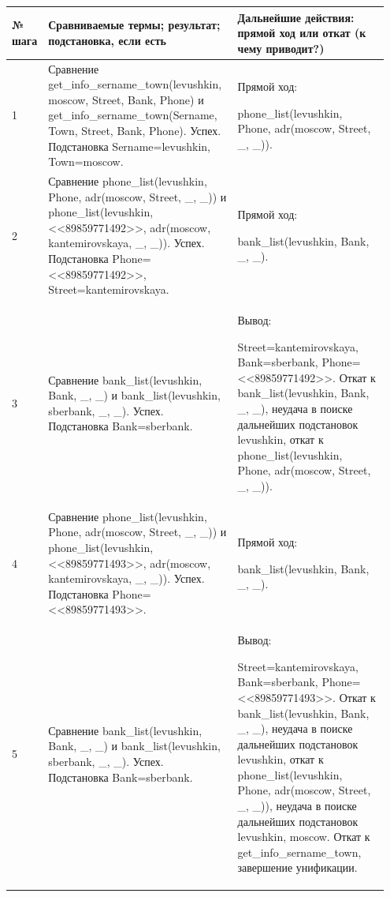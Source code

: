 \documentclass[a4paper,12pt]{article}
\begin{document}
	\begin{table} [h!]
		\begin{center}
			\begin{tabular}{|p{0.05\linewidth}|p{0.5\linewidth}|p{0.4\linewidth}|}
				{\bf  № шага} & {\bf Сравниваемые термы; результат; подстановка, если есть} & {\bf Дальнейшие действия: прямой ход или откат (к чему приводит?)} \\
				\hline
				{1} & {Сравнение get\_info\_sername\_town(levushkin, moscow, Street, Bank, Phone) и get\_info\_sername\_town(Sername, Town, Street, Bank, Phone). Успех. Подстановка Sername=levushkin, Town=moscow.} & {Прямой ход:
					
					 phone\_list(levushkin, Phone, adr(moscow, Street, \_, \_)).}\\
				\hline
				{2} & {Сравнение phone\_list(levushkin, Phone, adr(moscow, Street, \_, \_)) и phone\_list(levushkin, <<89859771492>>, adr(moscow, kantemirovskaya, \_, \_)). Успех. Подстановка Phone=<<89859771492>>, Street=kantemirovskaya.} & {Прямой ход: 
					
					bank\_list(levushkin, Bank, \_, \_).}\\
				\hline
				{3} & {Сравнение bank\_list(levushkin, Bank, \_, \_) и bank\_list(levushkin, sberbank, \_, \_). Успех. Подстановка Bank=sberbank.} & {Вывод:
					
					 Street=kantemirovskaya, Bank=sberbank, Phone=<<89859771492>>. Откат к bank\_list(levushkin, Bank, \_, \_), неудача в поиске дальнейших подстановок levushkin, откат к phone\_list(levushkin, Phone, adr(moscow, Street, \_, \_)).}\\
				\hline
				{4} & {Сравнение phone\_list(levushkin, Phone, adr(moscow, Street, \_, \_)) и phone\_list(levushkin, <<89859771493>>, adr(moscow, kantemirovskaya, \_, \_)). Успех. Подстановка Phone=<<89859771493>>.} & {Прямой ход:
					
					 bank\_list(levushkin, Bank, \_, \_).}\\
				\hline
				{5} & {Сравнение bank\_list(levushkin, Bank, \_, \_) и bank\_list(levushkin, sberbank, \_, \_). Успех. Подстановка Bank=sberbank.} & {Вывод:
					
					 Street=kantemirovskaya, Bank=sberbank, Phone=<<89859771493>>. Откат к bank\_list(levushkin, Bank, \_, \_), неудача в поиске дальнейших подстановок levushkin, откат к phone\_list(levushkin, Phone, adr(moscow, Street, \_, \_)), неудача в поиске дальнейших подстановок levushkin, moscow. Откат к get\_info\_sername\_town, завершение унификации.}\\
				\hline
			\end{tabular}  
			\label{m3}
		\end{center}
	\end{table}
\end{document}
